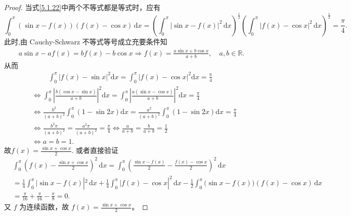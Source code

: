 \documentclass[../../main.tex]{subfiles}%
\begin{document}
\begin{proof}
当式\eqref{5.1.22}中两个不等式都是等式时，应有
\[
\int_{0}^{\pi} (\sin x - f(x))(f(x) - \cos x) \, \mathrm{d}x
= \left( \int_{0}^{\pi} |\sin x - f(x)|^2 \, \mathrm{d}x \right)^{\frac{1}{2}} \left( \int_{0}^{\pi} |f(x) - \cos x|^2 \, \mathrm{d}x \right)^{\frac{1}{2}} = \frac{\pi}{4}.
\]
此时,由 Cauchy-Schwarz 不等式等号成立充要条件知
\begin{align*}
a\sin x-af\left( x \right) =bf\left( x \right) -b\cos x\Longrightarrow f\left( x \right) =\frac{a\sin x+b\cos x}{a+b},\quad a,b\in \mathbb{R} .
\end{align*}
从而
\begin{align*}
&\qquad \,\, \int_0^{\pi}{\left| f\left( x \right) -\sin x \right|^2\mathrm{d}x}=\int_0^{\pi}{\left| f\left( x \right) -\cos x \right|^2\mathrm{d}x}=\frac{\pi}{4}
\\
&\Longleftrightarrow \int_0^{\pi}{\left| \frac{b\left( \cos x-\sin x \right)}{a+b} \right|^2\mathrm{d}x}=\int_0^{\pi}{\left| \frac{a\left( \sin x-\cos x \right)}{a+b} \right|^2\mathrm{d}x}=\frac{\pi}{4}
\\
&\Longleftrightarrow \frac{b^2}{\left( a+b \right) ^2}\int_0^{\pi}{\left( 1-\sin 2x \right) \mathrm{d}x}=\frac{a^2}{\left( a+b \right) ^2}\int_0^{\pi}{\left( 1-\sin 2x \right) \mathrm{d}x}=\frac{\pi}{4}
\\
&\Longleftrightarrow \frac{b^2\pi}{\left( a+b \right) ^2}=\frac{a^2\pi}{\left( a+b \right) ^2}=\frac{\pi}{4}\Longleftrightarrow \frac{a}{a+b}=\frac{b}{a+b}=\frac{1}{2}
\\
&\Longleftrightarrow a=b=1.
\end{align*}
故$f\left( x \right) =\frac{\sin x+\cos x}{2}.$
或者直接验证
\begin{align*}
&\int_0^{\pi}{\left( f(x)-\frac{\sin x+\cos x}{2} \right) ^2\,\mathrm{d}x}=\int_0^{\pi}{\left( \frac{\sin x-f(x)}{2}-\frac{f(x)-\cos x}{2} \right) ^2\,\mathrm{d}x}
\\
&=\frac{1}{4}\int_0^{\pi}{|\sin x}-f(x)|^2\,\mathrm{d}x+\frac{1}{4}\int_0^{\pi}{|f(x)}-\cos x|^2\,\mathrm{d}x
-\frac{1}{2}\int_0^{\pi}{(\sin x}-f(x))(f(x)-\cos x)\,\mathrm{d}x
\\
&=\frac{\pi}{16}+\frac{\pi}{16}-\frac{\pi}{8}=0.
\end{align*}
又 \( f \) 为连续函数，故 \( f(x) = \frac{\sin x + \cos x}{2} \)。
\end{proof}
\end{document}
